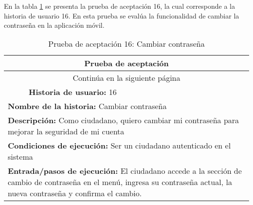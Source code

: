 En la tabla \ref{tab:prueba-16} se presenta la prueba de aceptación 16, la cual corresponde a la historia de usuario 16.
En esta prueba se evalúa la funcionalidad de cambiar la contraseña en la aplicación móvil.

\begin{longtable}{|p{6.7cm}|p{6.7cm}|}
    \caption{Prueba de aceptación 16: Cambiar contraseña} \label{tab:prueba-16}                                                                                                                                                                             \\
    \hline
    \multicolumn{2}{|c|}{\textbf{Prueba de aceptación}}                                                                                                                                                                                                     \\
    \hline
    \endfirsthead
    \hline
    \endhead
    \hline
    \multicolumn{2}{|c|}{{Continúa en la siguiente página}}                                                                                                                                                                                                 \\
    \hline
    \endfoot
    \hline
    \endlastfoot
    \multicolumn{1}{|p{6.7cm}|}{\textbf{Número} 16} & \multicolumn{1}{|p{6.7cm}|}{\textbf{Historia de usuario:} 16}                                                                                                                                         \\
    \hline
    \multicolumn{2}{|p{13.4cm}|}{\textbf{Nombre de la historia:} Cambiar contraseña}                                                                                                                                                                        \\
    \hline
    \multicolumn{2}{|p{13.4cm}|}{\textbf{Descripción:} Como ciudadano, quiero cambiar mi contraseña para mejorar la seguridad de mi cuenta}                                                                                                                 \\
    \hline
    \multicolumn{2}{|p{13.4cm}|}{\textbf{Condiciones de ejecución:} Ser un ciudadano autenticado en el sistema}                                                                                                                                             \\
    \hline
    \multicolumn{2}{|p{13.4cm}|}{\textbf{Entrada/pasos de ejecución:} El ciudadano accede a la sección de cambio de contraseña en el menú, ingresa su contraseña actual, la nueva contraseña y confirma el cambio.}                                         \\

\end{longtable}
